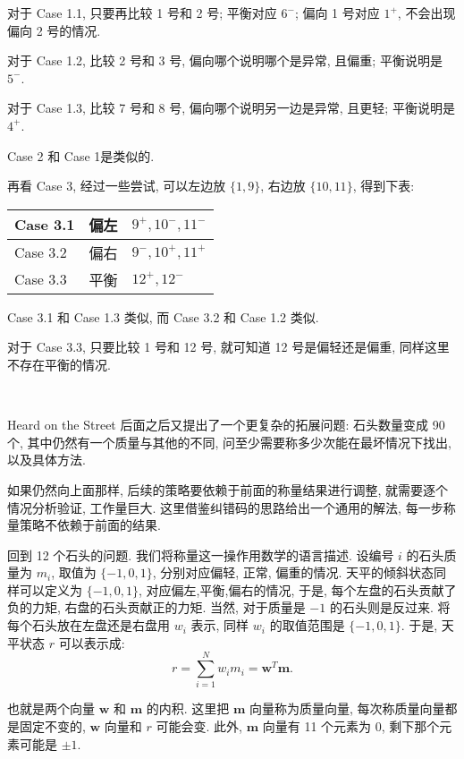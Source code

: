 对于 Case 1.1, 只要再比较 1 号和 2 号; 平衡对应 $ 6^- $; 偏向 1 号对应 $ 1^+ $, 不会出现偏向 2 号的情况. 

对于 Case 1.2, 比较 2 号和 3 号, 偏向哪个说明哪个是异常, 且偏重; 平衡说明是 $ 5^- $. 

对于 Case 1.3, 比较 7 号和 8 号, 偏向哪个说明另一边是异常, 且更轻; 平衡说明是 $ 4^+ $.

Case 2 和 Case 1是类似的. 

再看 Case 3, 经过一些尝试, 可以左边放 $ \{ 1,9 \} $, 右边放 $ \{ 10, 11 \} $, 得到下表:
\begin{figure*}[htbp]
\centering
\setlength\extrarowheight{2pt}
\begin{tabular}{l|l|l}
\hline
Case 3.1 & 偏左  & $9^+, 10^-, 11^-$ \\ \hline
Case 3.2 & 偏右  & $9^-, 10^+, 11^+ $ \\ \hline
Case 3.3 & 平衡  & $12^+, 12^- $ \\ \hline
\end{tabular}
\end{figure*}

Case 3.1 和 Case 1.3 类似, 而 Case 3.2 和 Case 1.2 类似. 

对于 Case 3.3, 只要比较 1 号和 12 号, 就可知道 12 号是偏轻还是偏重, 同样这里不存在平衡的情况.

~

Heard on the Street 后面之后又提出了一个更复杂的拓展问题: 石头数量变成 90 个, 其中仍然有一个质量与其他的不同, 问至少需要称多少次能在最坏情况下找出, 以及具体方法.

如果仍然向上面那样, 后续的策略要依赖于前面的称量结果进行调整, 就需要逐个情况分析验证, 工作量巨大. 这里借鉴纠错码的思路给出一个通用的解法, 每一步称量策略不依赖于前面的结果.

回到 12 个石头的问题. 我们将称量这一操作用数学的语言描述. 设编号 $ i $ 的石头质量为 $ m_i $, 取值为 $ \{-1,0,1\} $, 分别对应偏轻, 正常, 偏重的情况. 天平的倾斜状态同样可以定义为 $ \{-1, 0, 1\} $, 对应偏左,平衡,偏右的情况, 于是, 每个左盘的石头贡献了负的力矩, 右盘的石头贡献正的力矩. 当然, 对于质量是 $-1$ 的石头则是反过来. 将每个石头放在左盘还是右盘用 $ w_i $ 表示, 同样 $w_i$ 的取值范围是 $ \{-1, 0, 1\} $. 于是, 天平状态 $ r $ 可以表示成:
\[ r = \sum_{i=1}^N{w_im_i} = \boldsymbol{w}^T\boldsymbol{m} .\]

也就是两个向量 $ \boldsymbol{w} $ 和 $ \boldsymbol{m} $ 的内积.
这里把 $ \boldsymbol{m} $ 向量称为质量向量, 每次称质量向量都是固定不变的, $ \boldsymbol{w} $ 向量和 $ r $ 可能会变. 此外, $ \boldsymbol{m} $ 向量有 11 个元素为 0, 剩下那个元素可能是 $\pm{1}$.

